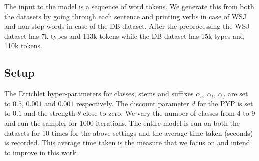 \documentclass{article}
\begin{document}
The input to the model is a sequence of word tokens. We generate this 
from both the datasets by going through each sentence and printing verbs 
in case of WSJ and non-stop-words in case of the DB dataset. After the 
preprocessing the WSJ dataset has 7k types and 113k tokens while the 
DB dataset has 15k types and 110k tokens.

\subsection{Setup}

The Dirichlet hyper-parameters for classes, stems and suffixes 
$\alpha_{c}$, $\alpha_{t}$, $\alpha_{f}$ are set to 
$0.5$, $0.001$ and $0.001$ respectively. The discount parameter $d$ for the PYP is set 
to $0.1$ and the strength $\theta$ close to zero.
We vary the number of classes from 4 to 9 and run the sampler for 1000 
iterations. The entire model is run on both the datasets for 10 times 
for the above settings and the average time taken (seconds) is recorded.
This average time taken is the measure that we focus on and intend to 
improve in this work.
\end{document}
